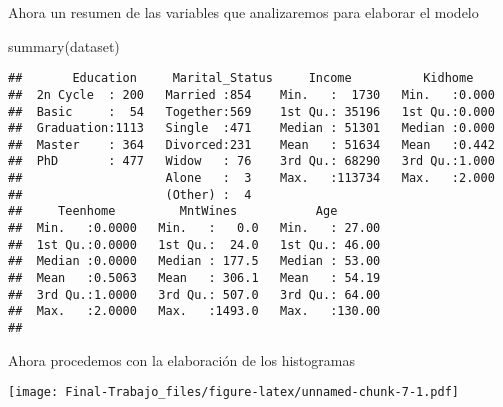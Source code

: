 \documentclass[Iberoamerican Journal of Industrial
Engineering,article,submit,moreauthors,pdftex]{Definitions/mdpi}
\newenvironment{Shaded}{\begin{snugshade}}{\end{snugshade}}
\newcommand{\AttributeTok}[1]{\textcolor[rgb]{0.77,0.63,0.00}{#1}}
\newcommand{\ConstantTok}[1]{\textcolor[rgb]{0.00,0.00,0.00}{#1}}
\newcommand{\DecValTok}[1]{\textcolor[rgb]{0.00,0.00,0.81}{#1}}
\newcommand{\FunctionTok}[1]{\textcolor[rgb]{0.00,0.00,0.00}{#1}}
\newcommand{\NormalTok}[1]{#1}
\newcommand{\SpecialCharTok}[1]{\textcolor[rgb]{0.00,0.00,0.00}{#1}}
\newcommand{\StringTok}[1]{\textcolor[rgb]{0.31,0.60,0.02}{#1}}
\begin{document}
Ahora un resumen de las variables que analizaremos para elaborar el
modelo

\begin{Shaded}
\begin{Highlighting}[]
\FunctionTok{summary}\NormalTok{(dataset)}
\end{Highlighting}
\end{Shaded}

\begin{verbatim}
##       Education     Marital_Status     Income          Kidhome     
##  2n Cycle  : 200   Married :854    Min.   :  1730   Min.   :0.000  
##  Basic     :  54   Together:569    1st Qu.: 35196   1st Qu.:0.000  
##  Graduation:1113   Single  :471    Median : 51301   Median :0.000  
##  Master    : 364   Divorced:231    Mean   : 51634   Mean   :0.442  
##  PhD       : 477   Widow   : 76    3rd Qu.: 68290   3rd Qu.:1.000  
##                    Alone   :  3    Max.   :113734   Max.   :2.000  
##                    (Other) :  4                                    
##     Teenhome         MntWines           Age        
##  Min.   :0.0000   Min.   :   0.0   Min.   : 27.00  
##  1st Qu.:0.0000   1st Qu.:  24.0   1st Qu.: 46.00  
##  Median :0.0000   Median : 177.5   Median : 53.00  
##  Mean   :0.5063   Mean   : 306.1   Mean   : 54.19  
##  3rd Qu.:1.0000   3rd Qu.: 507.0   3rd Qu.: 64.00  
##  Max.   :2.0000   Max.   :1493.0   Max.   :130.00  
## 
\end{verbatim}

Ahora procedemos con la elaboración de los histogramas

\begin{Shaded}
\end{Shaded}

\texttt{[image: Final-Trabajo\_files/figure-latex/unnamed-chunk-7-1.pdf]}

\begin{Shaded}
\end{Shaded}
\end{document}
